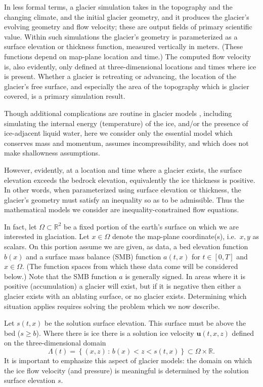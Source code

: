 \documentclass[hidelinks,onefignum,onetabnum,final]{siamart220329}  %
\newcommand{\RR}{\mathbb{R}}
\newcommand{\bu}{\mathbf{u}}
\begin{document}
In less formal terms, a glacier simulation takes in the topography and the changing climate, and the initial glacier geometry, and it produces the glacier's evolving geometry and flow velocity; these are output fields of primary scientific value.  Within such simulations the glacier's geometry is parameterized as a surface elevation or thickness function, measured vertically in meters.  (These functions depend on map-plane location and time.)  The computed flow velocity is, also evidently, only defined at three-dimensional locations and times where ice is present.  Whether a glacier is retreating or advancing, the location of the glacier's free surface, and especially the area of the topography which is glacier covered, is a primary simulation result.

Though additional complications are routine in glacier models \cite{GreveBlatter2009}, including simulating the internal energy (temperature) of the ice, and/or the presence of ice-adjacent liquid water, here we consider only the essential model which conserves mass and momentum, assumes incompressibility, and which does not make shallowness assumptions.

However, evidently, at a location and time where a glacier exists, the surface elevation exceeds the bedrock elevation, equivalently the ice thickness is positive.  In other words, when parameterized using surface elevation or thickness, the glacier's geometry must satisfy an inequality so as to be admissible.  Thus the mathematical models we consider are inequality-constrained flow equations.

In fact, let $\Omega \subset \RR^2$ be a fixed portion of the earth's surface on which we are interested in glaciation.  Let $x\in\Omega$ denote the map-plane coordinate(s), i.e.~$x,y$ as scalars.  On this portion assume we are given, as data, a bed elevation function $b(x)$ and a surface mass balance (SMB) function $a(t,x)$ for $t\in [0,T]$ and $x\in \Omega$.  (The function spaces from which these data come will be considered below.)  Note that the SMB function $a$ is generally signed.  In areas where it is positive (accumulation) a glacier will exist, but if it is negative then either a glacier exists with an ablating surface, or no glacier exists.  Determining which situation applies requires solving the problem which we now describe.

Let $s(t,x)$ be the solution surface elevation.  This surface must be above the bed ($s\ge b$).  Where there is ice there is a solution ice velocity $\bu(t,x,z)$ defined on the three-dimensional domain
\begin{equation}
\Lambda(t) = \left\{(x,z)\,:\,b(x) < z < s(t,x)\right\} \subset \Omega \times \RR. \label{eq:icydomain}
\end{equation}
It is important to emphasize this aspect of glacier models: the domain on which the ice flow velocity (and pressure) is meaningful is determined by the solution surface elevation $s$.
\end{document}
